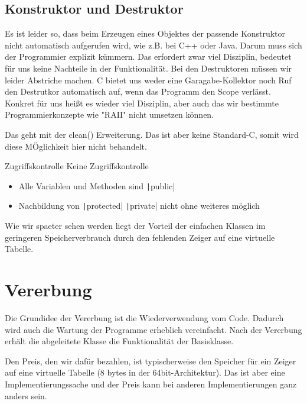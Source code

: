 \documentclass{article}
\begin{document}
\subsection{Konstruktor und Destruktor}
Es ist leider so, dass beim Erzeugen eines Objektes der passende Konstruktor nicht automatisch aufgerufen wird, wie z.B. bei C++ oder Java.
Darum muss sich der Programmier explizit kümmern.
Das erfordert zwar viel Disziplin, bedeutet für uns keine Nachteile in der Funktionalität.
Bei den Destruktoren müssen wir leider Abstriche machen.
C bietet uns weder eine Garagabe-Kollektor noch Ruf den Destrutkor automatisch auf, wenn das Programm den Scope verlässt.
Konkret für uns heißt es wieder viel Disziplin, aber auch das wir bestimmte Programmierkonzepte wie "RAII" nicht umsetzen können.

\begin{note}
	Das geht mit der clean() Erweiterung. Das ist aber keine Standard-C, somit wird diese MÖglichkeit hier nicht behandelt.
\end{note}


\begin{missing}{Zugriffskontrolle}
	 Keine Zugriffskontrolle
		 \begin{itemize}
			 \item Alle Variablen und Methoden sind \texttt|public|
			 \item Nachbildung von \texttt|protected| \texttt|private| nicht ohne weiteres möglich
		 \end{itemize}
\end{missing}


Wie wir spaeter sehen werden liegt der Vorteil der einfachen Klassen im geringeren Speicherverbrauch durch den fehlenden Zeiger auf eine virtuelle Tabelle.



\section{Vererbung}
Die Grundidee der Vererbung ist die Wiederverwendung vom Code.
Dadurch wird auch die Wartung der Programme erheblich vereinfacht.
Nach der Vererbung erhält die abgeleitete Klasse die Funktionalität der Basisklasse.

Den Preis, den wir dafür bezahlen, ist typischerweise den Speicher für ein Zeiger auf eine virtuelle Tabelle (8 bytes in der 64bit-Architektur).
Das ist aber eine Implementierungssache und der Preis kann bei anderen Implementierungen ganz anders sein.
\end{document}
